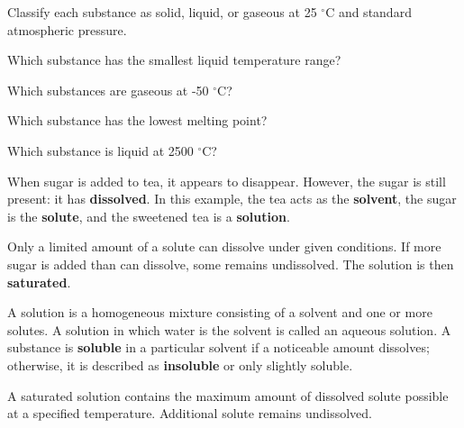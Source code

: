 \begin{ExerciseParts}

\item Classify each substance as solid, liquid, or gaseous at 25 $^{\circ}$C and standard atmospheric pressure.

\ResponseGap[20pt]

\item Which substance has the smallest liquid temperature range?

\ResponseGap[20pt]

\item Which substances are gaseous at -50 $^{\circ}$C?

\ResponseGap[20pt]

\item Which substance has the lowest melting point?

\ResponseGap[20pt]

\item Which substance is liquid at 2500 $^{\circ}$C?

\ResponseGap[20pt]

\end{ExerciseParts}


\begin{center}%
\resizebox{0.70\linewidth}{!}{\StateChangesWorksheetFigure}\end{center}



When sugar is added to tea, it appears to disappear. However, the sugar is still present: it has \textbf{dissolved}. In this example, the tea acts as the \textbf{solvent}, the sugar is the \textbf{solute}, and the sweetened tea is a \textbf{solution}.


Only a limited amount of a solute can dissolve under given conditions. If more sugar is added than can dissolve, some remains undissolved. The solution is then \textbf{saturated}.


A solution is a homogeneous mixture consisting of a solvent and one or more solutes. A solution in which water is the solvent is called an aqueous solution. A substance is \textbf{soluble} in a particular solvent if a noticeable amount dissolves; otherwise, it is described as \textbf{insoluble} or only slightly soluble.


A saturated solution contains the maximum amount of dissolved solute possible at a specified temperature. Additional solute remains undissolved.


